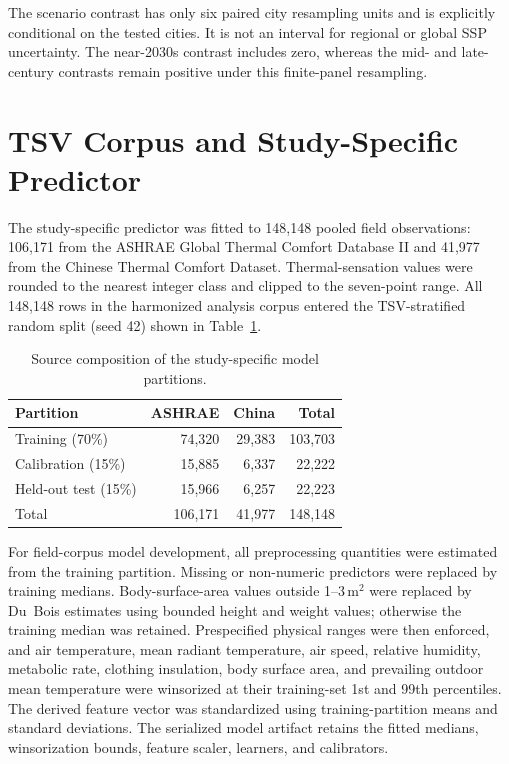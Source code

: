 \documentclass[11pt]{article}
\begin{document}
The scenario contrast has only six paired city resampling units and is explicitly conditional on the tested cities. It is not an interval for regional or global SSP uncertainty. The near-2030s contrast includes zero, whereas the mid- and late-century contrasts remain positive under this finite-panel resampling.

\section{TSV Corpus and Study-Specific Predictor}

The study-specific predictor was fitted to 148{,}148 pooled field observations: 106{,}171 from the ASHRAE Global Thermal Comfort Database II and 41{,}977 from the Chinese Thermal Comfort Dataset. Thermal-sensation values were rounded to the nearest integer class and clipped to the seven-point range. All 148{,}148 rows in the harmonized analysis corpus entered the TSV-stratified random split (seed 42) shown in Table~\ref{tab:supp_corpus_split}.

\begin{table}[htbp]
\centering
\caption{Source composition of the study-specific model partitions.}
\label{tab:supp_corpus_split}
\footnotesize
\begin{tabular}{lrrr}
\toprule
Partition & ASHRAE & China & Total \\
\midrule
Training (70\%) & 74{,}320 & 29{,}383 & 103{,}703 \\
Calibration (15\%) & 15{,}885 & 6{,}337 & 22{,}222 \\
Held-out test (15\%) & 15{,}966 & 6{,}257 & 22{,}223 \\
\midrule
Total & 106{,}171 & 41{,}977 & 148{,}148 \\
\bottomrule
\end{tabular}
\end{table}

For field-corpus model development, all preprocessing quantities were estimated from the training partition. Missing or non-numeric predictors were replaced by training medians. Body-surface-area values outside 1--3\,m$^2$ were replaced by Du~Bois estimates using bounded height and weight values; otherwise the training median was retained. Prespecified physical ranges were then enforced, and air temperature, mean radiant temperature, air speed, relative humidity, metabolic rate, clothing insulation, body surface area, and prevailing outdoor mean temperature were winsorized at their training-set 1st and 99th percentiles. The derived feature vector was standardized using training-partition means and standard deviations. The serialized model artifact retains the fitted medians, winsorization bounds, feature scaler, learners, and calibrators.
\end{document}
